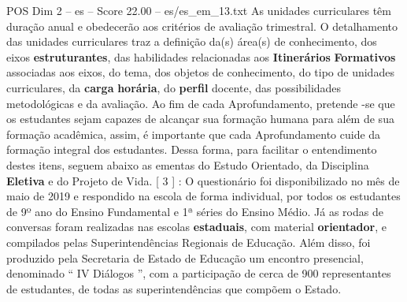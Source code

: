 \begin{textsample}{POS Dim 2 – es – Score 22.00 – es/es\_em\_13.txt}
As unidades curriculares têm duração anual e obedecerão aos critérios de avaliação trimestral.
O detalhamento das unidades curriculares traz a definição da(s) área(s) de conhecimento, dos eixos \textbf{estruturantes}, das habilidades relacionadas aos \textbf{Itinerários} \textbf{Formativos} associadas aos eixos, do tema, dos objetos de conhecimento, do tipo de unidades curriculares, da \textbf{carga} \textbf{horária}, do \textbf{perfil} docente, das possibilidades metodológicas e da avaliação.
Ao fim de cada Aprofundamento, pretende -se que os estudantes sejam capazes de alcançar sua formação humana para além de sua formação acadêmica, assim, é importante que cada Aprofundamento cuide da formação integral dos estudantes.
Dessa forma, para facilitar o entendimento destes itens, seguem abaixo as ementas do Estudo Orientado, da Disciplina \textbf{Eletiva} e do Projeto de Vida. [ 3 ] : O questionário foi disponibilizado no mês de maio de 2019 e respondido na escola de forma individual, por todos os estudantes de 9º ano do Ensino Fundamental e 1ª séries do Ensino Médio.
Já as rodas de conversas foram realizadas nas escolas \textbf{estaduais}, com material \textbf{orientador}, e compilados pelas Superintendências Regionais de Educação.
Além disso, foi produzido pela Secretaria de Estado de Educação um encontro presencial, denominado “ IV Diálogos ”, com a participação de cerca de 900 representantes de estudantes, de todas as superintendências que compõem o Estado.

\end{textsample}
